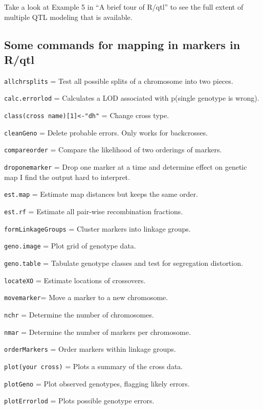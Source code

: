 \documentclass[
]{book}
\begin{document}
Take a look at Example 5 in ``A brief tour of R/qtl'' to see the full extent of multiple QTL modeling that is available.

\hypertarget{some-commands-for-mapping-in-markers-in-rqtl}{%
\subsection{Some commands for mapping in markers in R/qtl}\label{some-commands-for-mapping-in-markers-in-rqtl}}

\texttt{allchrsplits} = Test all possible splits of a chromosome into two pieces.

\texttt{calc.errorlod} = Calculates a LOD associated with p(single genotype is wrong).

\texttt{class(cross\ name){[}1{]}\textless{}-"dh"} = Change cross type.

\texttt{cleanGeno} = Delete probable errors. Only works for backcrosses.

\texttt{compareorder} = Compare the likelihood of two orderings of markers.

\texttt{droponemarker} = Drop one marker at a time and determine effect on genetic map I find the output hard to interpret.

\texttt{est.map} = Estimate map distances but keeps the same order.

\texttt{est.rf} = Estimate all pair-wise recombination fractions.

\texttt{formLinkageGroups} = Cluster markers into linkage groups.

\texttt{geno.image} = Plot grid of genotype data.

\texttt{geno.table} = Tabulate genotype classes and test for segregation distortion.

\texttt{locateXO} = Estimate locations of crossovers.

\texttt{movemarker}= Move a marker to a new chromosome.

\texttt{nchr} = Determine the number of chromosomes.

\texttt{nmar} = Determine the number of markers per chromosome.

\texttt{orderMarkers} = Order markers within linkage groups.

\texttt{plot(your\ cross)} = Plots a summary of the cross data.

\texttt{plotGeno} = Plot observed genotypes, flagging likely errors.

\texttt{plotErrorlod} = Plots possible genotype errors.
\end{document}

